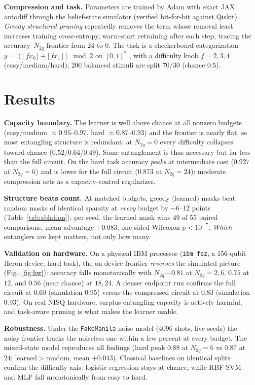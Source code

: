 \documentclass[10pt,conference]{IEEEtran}
\begin{document}
\textbf{Compression and task.} Parameters are trained by Adam with exact JAX autodiff through
the belief-state simulator (verified bit-for-bit against Qiskit). \emph{Greedy structured
pruning} repeatedly removes the term whose removal least increases training cross-entropy,
warm-start retraining after each step, tracing the accuracy--$N_{2q}$ frontier from 24 to 0. The
task is a checkerboard categorization
$y=(\lfloor f x_0\rfloor+\lfloor f x_1\rfloor)\bmod 2$ on $[0,1]^2$ \cite{b19}, with a difficulty
knob $f{=}2,3,4$ (easy/medium/hard); 200 balanced stimuli are split $70/30$ (chance $0.5$).

\section{Results}
\textbf{Capacity boundary.} The learner is well above chance at all nonzero budgets (easy/medium
$\approx0.95$--$0.97$, hard $\approx0.87$--$0.93$) and the frontier is nearly flat, so most
entangling structure is redundant; at $N_{2q}{=}0$ every difficulty collapses toward chance
($0.52$/$0.64$/$0.49$). Some entanglement is thus necessary but far less than the full circuit.
On the hard task accuracy \emph{peaks} at intermediate cost ($0.927$ at $N_{2q}{=}6$) and is
lower for the full circuit ($0.873$ at $N_{2q}{=}24$): moderate compression acts as a
capacity-control regularizer.

\textbf{Structure beats count.} At matched budgets, greedy (learned) masks beat random masks of
identical sparsity at \emph{every} budget by $\sim$6--12 points (Table~\ref{tab:ablation});
per seed, the learned mask wins $49$ of $55$ paired comparisons, mean advantage $+0.083$,
one-sided Wilcoxon $p<10^{-7}$. \emph{Which} entanglers are kept matters, not only how many.

\textbf{Validation on hardware.} On a physical IBM processor (\texttt{ibm\_fez}, a $156$-qubit
Heron device, hard task), the on-device frontier \emph{reverses} the simulated picture
(Fig.~\ref{fig:hw}): accuracy falls monotonically with $N_{2q}$---$0.81$ at $N_{2q}{=}2,6$,
$0.75$ at $12$, and $0.56$ (near chance) at $18,24$. A denser endpoint run confirms the full
circuit at $0.60$ (simulation $0.95$) versus the compressed circuit at $0.83$ (simulation
$0.93$). On real NISQ hardware, surplus entangling capacity is actively harmful, and task-aware
pruning is what makes the learner usable.

\textbf{Robustness.} Under the \texttt{FakeManila} noise model ($4096$ shots, five seeds) the
noisy frontier tracks the noiseless one within a few percent at every budget. The mixed-state
model reproduces all findings (hard peak $0.88$ at $N_{2q}{=}6$ vs $0.87$ at $24$;
learned${>}$random, mean $+0.043$). Classical baselines on identical splits confirm the
difficulty axis: logistic regression stays at chance, while RBF-SVM and MLP fall monotonically
from easy to hard.
\end{document}
